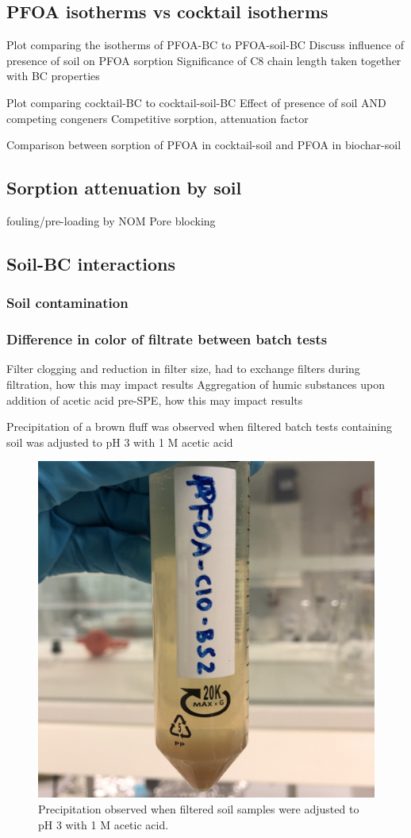 \subsection{PFOA isotherms vs cocktail isotherms}
Plot comparing the isotherms of PFOA-BC to PFOA-soil-BC
Discuss influence of presence of soil on PFOA sorption
Significance of C8 chain length taken together with BC properties 

Plot comparing cocktail-BC to cocktail-soil-BC
Effect of presence of soil AND competing congeners
Competitive sorption, attenuation factor

Comparison between sorption of PFOA in cocktail-soil and PFOA in biochar-soil

\subsection{Sorption attenuation by soil}
fouling/pre-loading by NOM
Pore blocking

\subsection{Soil-BC interactions}

\subsubsection{Soil contamination}

\subsubsection{Difference in color of filtrate between batch tests}
Filter clogging and reduction in filter size, had to exchange filters during filtration, how this may impact results
Aggregation of humic substances upon addition of acetic acid pre-SPE, how this may impact results

Precipitation of a brown fluff was observed when filtered batch tests containing soil was adjusted to pH 3 with 1 M acetic acid

\begin{figure}
    \centering
    \includegraphics[width=0.6\linewidth,scale=0.6]{Bilder/Samples/Precipitation.jpg}
    \caption{Precipitation observed when filtered soil samples were adjusted to pH 3 with 1 M acetic acid.}
    \label{fig:precip}
\end{figure}

